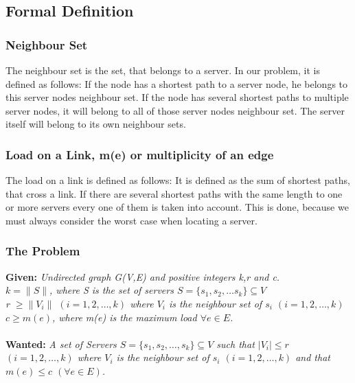\documentclass [12pt]{article}
\begin{document}
\subsection{Formal Definition}
\subsubsection{Neighbour Set}
    The neighbour set is the set, that belongs to a server. In our problem, it is
    defined as follows: If the node has a shortest path to a server node, he 
    belongs to this server nodes neighbour set. If the node has several shortest
    paths to multiple server nodes, it will belong to all of those server nodes neighbour
    set. The server itself will belong to its own neighbour sets.
    \subsubsection{Load on a Link, m(e) or multiplicity of an edge}
    The load on a link is defined as follows: 
    It is defined as the sum of shortest paths, that cross a link. If there
    are several shortest paths with the same length to one or more servers every
    one of them is taken into account. This is done, because we must always consider
    the worst case when locating a server.
    \subsubsection{The Problem}
\textbf{Given:}
{\itshape Undirected graph G(V,E) and  positive integers k,r and c. \\
$k = \|S\|$, where S is the set of servers $S = \{s_1,s_2,\dots s_k\} \subseteq V$\\
r $\geq  \|V_i\|$ $(i=1,2,\dots,k)$ where $V_i$ is the neighbour set of $s_i$ $(i=1,2,\dots,k)$\\
$c \geq m(e)$, where m(e) is the maximum load $\forall e \in E$.} \\
\\
\textbf{Wanted:} 
{\itshape A set of Servers $S = \{s_1, s_2,\dots, s_k \} \subseteq V$ such that $|V_i|\leq r$
    $(i = 1,2, \dots,k)$ where $V_i$ is the neighbour set of $s_i$  $(i = 1,2,\dots,k)$ and that
$m(e) \leq c$ $(\forall e \in E)$.}
\end{document}
